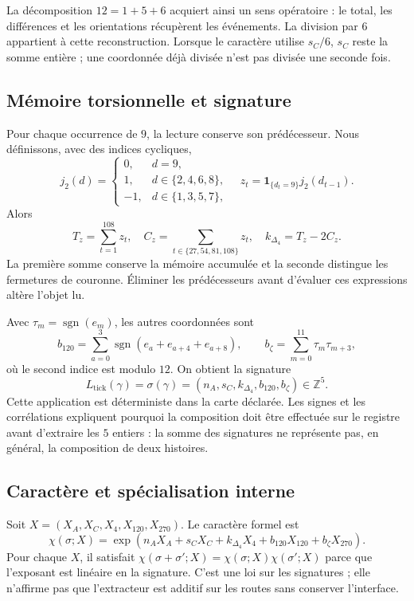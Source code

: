 La décomposition \(12=1+5+6\) acquiert ainsi un sens opératoire :
le total, les différences et les orientations récupèrent les événements.
La division par \(6\) appartient à cette reconstruction. Lorsque le caractère
utilise \(s_C/6\), \(s_C\) reste la somme entière ; une coordonnée déjà
divisée n’est pas divisée une seconde fois.

\subsection{Mémoire torsionnelle et signature}

Pour chaque occurrence de \(9\), la lecture conserve son prédécesseur.
Nous définissons, avec des indices cycliques,
\[
 j_2(d)=\begin{cases}0,&d=9,\\1,&d\in\{2,4,6,8\},\\-1,&d\in\{1,3,5,7\},\end{cases}
 \quad z_t=\mathbf1_{\{d_t=9\}}j_2(d_{t-1}).
\]
Alors
\[
 T_z=\sum_{t=1}^{108}z_t,\quad
 C_z=\sum_{t\in\{27,54,81,108\}}z_t,\quad
 k_{\Delta_4}=T_z-2C_z.
\]
La première somme conserve la mémoire accumulée et la seconde distingue les
fermetures de couronne. Éliminer les prédécesseurs avant d’évaluer ces
expressions altère l’objet lu.

Avec \(\tau_m=\operatorname{sgn}(e_m)\), les autres coordonnées sont
\[
 b_{120}=\sum_{a=0}^{3}\operatorname{sgn}(e_a+e_{a+4}+e_{a+8}),
 \qquad b_{\zeta}=\sum_{m=0}^{11}\tau_m\tau_{m+3},
\]
où le second indice est modulo \(12\). On obtient la signature
\[
 L_{\mathrm{tick}}(\gamma)
 =\sigma(\gamma)=(n_A,s_C,k_{\Delta_4},b_{120},b_{\zeta})\in\mathbb Z^5.
\]
Cette application est déterministe dans la carte déclarée. Les signes et les
corrélations expliquent pourquoi la composition doit être effectuée sur le
registre avant d'extraire les \(5\) entiers : la somme des signatures ne
représente pas, en général, la composition de deux histoires.

\subsection{Caractère et spécialisation interne}

Soit \(X=(X_A,X_C,X_4,X_{120},X_{270})\). Le caractère formel est
\[
 \chi(\sigma;X)=\exp\!\left(n_AX_A+s_CX_C+k_{\Delta_4}X_4+
 b_{120}X_{120}+b_{\zeta}X_{270}\right).
\]
Pour chaque \(X\), il satisfait
\(\chi(\sigma+\sigma';X)=\chi(\sigma;X)\chi(\sigma';X)\)
parce que l’exposant est linéaire en la signature. C’est une loi sur les signatures ; elle
n’affirme pas que l’extracteur est additif sur les routes sans conserver l’interface.

